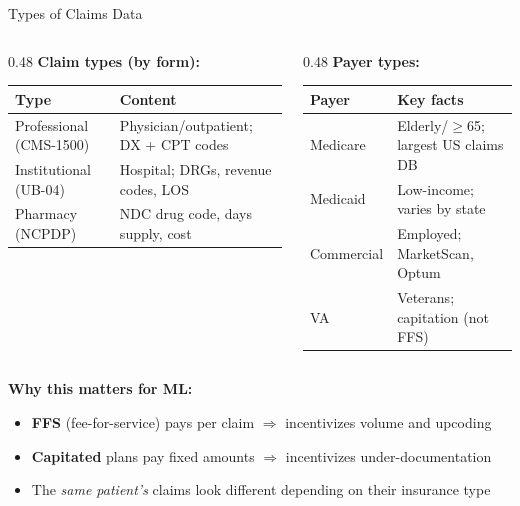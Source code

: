 \documentclass[aspectratio=169,10pt]{beamer}
\begin{document}
\begin{frame}{Types of Claims Data}
\begin{columns}[T]
\begin{column}{0.48\textwidth}
\textbf{Claim types (by form):}
\vspace{0.2em}

\scriptsize
\begin{tabular}{p{1.8cm}p{4cm}}
\toprule
\textbf{Type} & \textbf{Content} \\
\midrule
Professional (CMS-1500) & Physician/outpatient; DX + CPT codes \\
Institutional (UB-04) & Hospital; DRGs, revenue codes, LOS \\
Pharmacy (NCPDP) & NDC drug code, days supply, cost \\
\bottomrule
\end{tabular}
\end{column}
\begin{column}{0.48\textwidth}
\textbf{Payer types:}
\vspace{0.2em}

\scriptsize
\begin{tabular}{p{1.8cm}p{4cm}}
\toprule
\textbf{Payer} & \textbf{Key facts} \\
\midrule
Medicare & Elderly/$\geq$65; largest US claims DB \\
Medicaid & Low-income; varies by state \\
Commercial & Employed; MarketScan, Optum \\
VA & Veterans; capitation (not FFS) \\
\bottomrule
\end{tabular}
\end{column}
\end{columns}

\vspace{0.8em}
\textbf{Why this matters for ML:}
\begin{itemize}
    \item \textbf{FFS} (fee-for-service) pays per claim $\Rightarrow$ incentivizes volume and upcoding
    \item \textbf{Capitated} plans pay fixed amounts $\Rightarrow$ incentivizes under-documentation
    \item The \emph{same patient's} claims look different depending on their insurance type
\end{itemize}
\end{frame}
\end{document}
